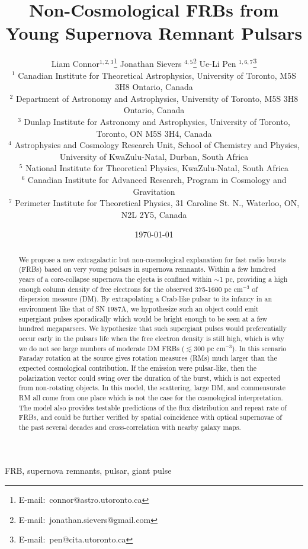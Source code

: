 \documentclass[useAMS,usenatbib]{mn2e}
\title{Non-Cosmological FRBs from Young Supernova Remnant Pulsars}
\author[Connor et al.]{
Liam Connor$^{1,2,3}$\thanks{E-mail:\ connor@astro.utoronto.ca}
Jonathan Sievers $^{4, 5}$\thanks{E-mail:\ jonathan.sievers@gmail.com}
Ue-Li Pen $^{1, 6, 7}$\thanks{E-mail:\ pen@cita.utoronto.ca}
\\
$^1$ Canadian Institute for Theoretical Astrophysics, University of Toronto, M5S 3H8 Ontario, Canada
\\
$^2$ Department of Astronomy and Astrophysics, University of Toronto, 
M5S 3H8 Ontario, Canada
\\
$^3$ Dunlap Institute for Astronomy and Astrophysics, University of Toronto,
Toronto, ON M5S 3H4, Canada
\\
$^4$ Astrophysics and Cosmology Research Unit, School of Chemistry and Physics, University of KwaZulu-Natal, Durban, South Africa
\\
$^5$ National Institute for Theoretical Physics, KwaZulu-Natal, South Africa
\\
$^6$ Canadian Institute for Advanced Research, Program in Cosmology
and Gravitation
\\
$^7$ Perimeter Institute for Theoretical Physics, 31 Caroline St. N., Waterloo, ON, N2L 2Y5, Canada
}
\begin{document}
\date{\today}
\pagerange{\pageref{firstpage}--\pageref{lastpage}} 
\maketitle
\label{firstpage}

\begin{abstract}
We propose a new extragalactic but non-cosmological explanation for fast radio bursts 
(FRBs) based on
very young pulsars in supernova remnants. Within a few hundred years of a 
core-collapse supernova the ejecta 
is confined within $\sim$1 pc, providing a high enough column density of free electrons 
for the observed 375-1600 pc cm$^{-3}$ of dispersion measure (DM). By extrapolating a Crab-like pulsar to 
its infancy in an environment like that of SN 1987A, 
we hypothesize such an object could emit supergiant pulses sporadically which 
would be bright enough to be seen at a few hundred megaparsecs. We hypothesize that
such supergiant pulses would preferentially occur early in the pulsars life when the 
free electron density is still high, which is why we do not see large numbers of 
moderate DM FRBs ($\lesssim300$ pc cm$^{-3}$). 
In this scenario Faraday
rotation at the source gives rotation measures (RMs) much larger than the expected
cosmological contribution.  If the emission were pulsar-like, then the polarization 
vector could swing over the duration of the burst, which is not expected from 
non-rotating objects.
In this model, the scattering,
large DM, and commensurate RM all come from one place which is not the case for the cosmological
interpretation. The model also provides
testable predictions of the flux distribution and repeat rate of FRBs, and could be further
verified by spatial coincidence with optical supernovae of the past several decades and
cross-correlation with nearby galaxy maps. 
\end{abstract}
\begin{keywords}
FRB, supernova remnants, pulsar, giant pulse
\end{keywords}

\end{document}
